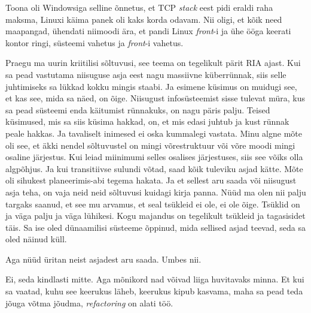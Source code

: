 Toona oli Windowsiga selline õnnetus, et TCP \emph{stack} eest 
pidi eraldi raha maksma, Linuxi käima panek oli kaks korda odavam. Nii oligi, 
et 
kõik need maapangad, ühendati niimoodi ära, et pandi Linux \emph{front}-i ja 
ühe ööga keerati kontor ringi, süsteemi vahetus ja  \emph{front}-i vahetus. 


Praegu ma uurin kriitilisi sõltuvusi, see teema on tegelikult pärit 
RIA ajast. 
Kui sa pead vastutama niisuguse asja eest nagu massiivne küberrünnak, siis 
selle juhtimiseks sa lükkad kokku mingis staabi. Ja esimene küsimus on muidugi 
see, et kas see, mida sa näed, on õige. Niisugust  infosüsteemist 
sisse tulevat müra, kus  sa pead süsteemi enda käitumist rünnakuks, on nagu 
päris palju.  Teised küsimused, mis sa siis küsima hakkad, on, et mis edasi 
juhtub ja kust rünnak peale hakkas. Ja tavaliselt  inimesed ei oska  kummalegi 
vastata. Minu algne mõte oli see, et äkki nendel sõltuvustel on mingi 
võrestruktuur või võre moodi mingi osaline järjestus. Kui leiad  miinimumi  
selles osalises järjestuses, siis see võiks olla algpõhjus. Ja kui transitiivse 
sulundi võtad, saad kõik tuleviku asjad kätte. Mõte oli sihukest 
planeerimis-abi 
tegema hakata. Ja et sellest aru saada või niisugust asja teha, on vaja 
neid neid sõltuvusi kuidagi kirja panna. Nüüd ma olen nii palju targaks saanud, 
et see mu arvamus, et seal tsükleid ei ole, ei ole õige. Tsüklid on ja väga 
palju ja väga lühikesi. Kogu majandus on tegelikult tsükleid ja tagasisidet 
täis.  Sa ise oled dünaamilisi süsteeme õppinud, mida sellised asjad teevad, 
seda sa oled näinud küll.

Aga nüüd üritan neist asjadest aru saada. Umbes nii.
           
                       
Ei, seda kindlasti mitte. Aga mõnikord nad võivad liiga huvitavaks minna. Et 
kui sa vaatad, kuhu see keerukus läheb, keerukus kipub kasvama, maha sa pead 
teda jõuga võtma jõudma, \emph{refactoring} on alati töö.
